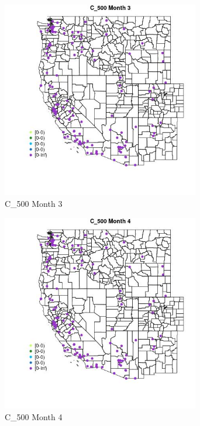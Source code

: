 \begin{figure} 
\centering  
\includegraphics[width=0.77\textwidth]{Code_Outputs/Report_ML_input_PM25_Step4_part_e_de_duplicated_aves_MapObsMo3C_500.jpg} 
\caption{\label{fig:Report_ML_input_PM25_Step4_part_e_de_duplicated_avesMapObsMo3C_500}C_500 Month 3} 
\end{figure} 
 

\clearpage 

\begin{figure} 
\centering  
\includegraphics[width=0.77\textwidth]{Code_Outputs/Report_ML_input_PM25_Step4_part_e_de_duplicated_aves_MapObsMo4C_500.jpg} 
\caption{\label{fig:Report_ML_input_PM25_Step4_part_e_de_duplicated_avesMapObsMo4C_500}C_500 Month 4} 
\end{figure} 
 

